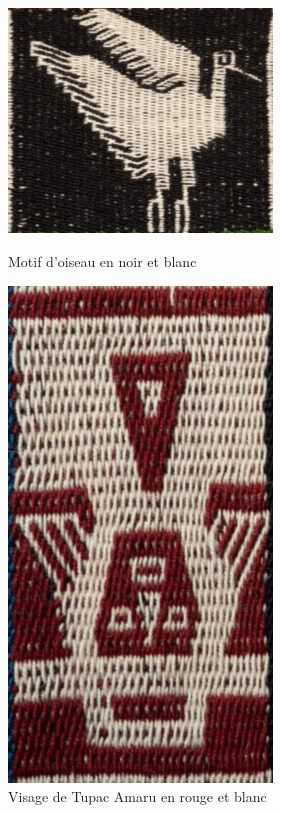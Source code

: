 \documentclass[a4paper, twoside, 12pt]{book}
\begin{document}
\begin{figure}[!h]
    \begin{minipage}[c]{.5\linewidth}
            \begin{center}
                \includegraphics[width=7cm]{images/A2_L02.jpg}
                \caption[Motif noir et blanc]{Motif d'oiseau en noir et blanc}
                \label{nb}
            \end{center}
    \end{minipage}
    \begin{minipage}[c]{.5\linewidth}
        \begin{center}
            \includegraphics[width=7cm, angle=-180]{images/A1_G08.jpg}
            \caption[Motif rouge et blanc]{Visage de Tupac Amaru en rouge et blanc}
            \label{rb}
        \end{center}
    \end{minipage}
\end{figure}
\end{document}
